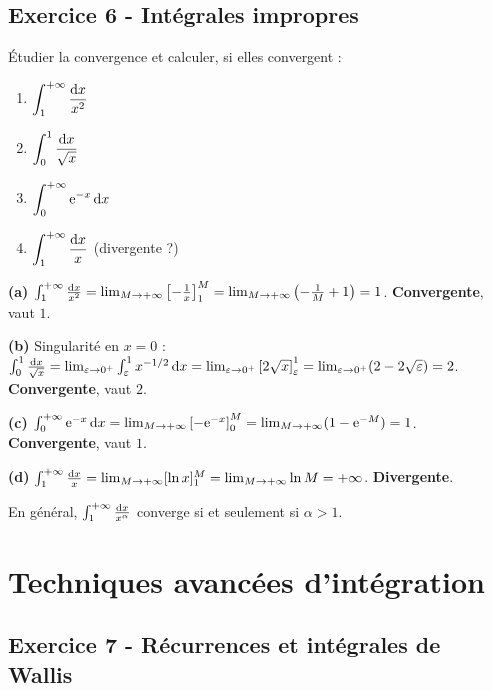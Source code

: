 \documentclass[12pt,a4paper]{article}
\begin{document}
\subsection*{Exercice 6 - Intégrales impropres \niveau{\difficile}}

\begin{boiteexercice}
Étudier la convergence et calculer, si elles convergent :
\begin{enumerate}[label=(\alph*)]
  \item $\displaystyle\int_1^{+\infty}\frac{\mathrm{d} x}{x^2}$
  \item $\displaystyle\int_0^1\frac{\mathrm{d} x}{\sqrt{x}}$
  \item $\displaystyle\int_0^{+\infty}\mathrm{e}^{-x}\,\mathrm{d} x$
  \item $\displaystyle\int_1^{+\infty}\frac{\mathrm{d} x}{x}$ (divergente ?)
\end{enumerate}
\end{boiteexercice}

\begin{boitecorrige}
\textbf{(a)} $\int_1^{+\infty}\frac{\mathrm{d} x}{x^2} = \lim_{M\to+\infty}\left[-\frac{1}{x}\right]_1^M = \lim_{M\to+\infty}\left(-\frac{1}{M}+1\right) = 1$. \textbf{Convergente}, vaut $1$.

\textbf{(b)} Singularité en $x=0$ : $\int_0^1\frac{\mathrm{d} x}{\sqrt{x}} = \lim_{\varepsilon\to0^+}\int_\varepsilon^1 x^{-1/2}\,\mathrm{d} x = \lim_{\varepsilon\to0^+}\left[2\sqrt{x}\right]_\varepsilon^1 = \lim_{\varepsilon\to0^+}(2-2\sqrt{\varepsilon}) = 2$. \textbf{Convergente}, vaut $2$.

\textbf{(c)} $\int_0^{+\infty}\mathrm{e}^{-x}\,\mathrm{d} x = \lim_{M\to+\infty}\left[-\mathrm{e}^{-x}\right]_0^M = \lim_{M\to+\infty}(1-\mathrm{e}^{-M}) = 1$. \textbf{Convergente}, vaut $1$.

\textbf{(d)} $\int_1^{+\infty}\frac{\mathrm{d} x}{x} = \lim_{M\to+\infty}[\ln x]_1^M = \lim_{M\to+\infty}\ln M = +\infty$. \textbf{Divergente}.

En général, $\int_1^{+\infty}\frac{\mathrm{d} x}{x^\alpha}$ converge si et seulement si $\alpha > 1$.
\end{boitecorrige}

\section{Techniques avancées d'intégration}

\subsection*{Exercice 7 - Récurrences et intégrales de Wallis \niveau{\difficile}}
\end{document}
